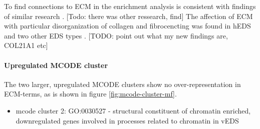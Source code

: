 To find connections to ECM in the enrichment analysis is consistent with findings of similar research \cite{Ritelli2022}. [Todo: there was other ressearch, find] The affection of ECM with particular disorganization of collagen and fibrocencting was found in hEDS and two other EDS types \cite{Chiarelli2018}. [TODO: point out what my new findings are, COL21A1 etc]

\paragraph{Upregulated MCODE cluster}

The two larger, upregulated MCODE clusters show no over-representation in ECM-terms, as is shown in figure \ref{fig:mcode-cluster-mf}.

\begin{itemize}
	\item mcode cluster 2: 	GO:0030527 - structural constituent of chromatin enriched, downregulated genes involved in processes related to chromatin in vEDS \cite{Chiarelli2018}
\end{itemize}

